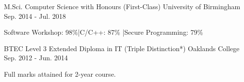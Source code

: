 

\begin{cventries}

  \cventry
  {M.Sci. Computer Science with Honours (First-Class)} %
    {University of Birmingham} %
    {} %
    {Sep. 2014 - Jul. 2018} %
    {
      \begin{cvitems}
      \item {Software Workshop: 98\%\hspace*{3mm}|\hspace*{3mm}C/C++: 87\%
        \hspace*{3mm}|\hspace*{3mm}Secure Programming: 79\%}
      \end{cvitems}
    }

  \cventry
  {BTEC Level 3 Extended Diploma in IT (Triple Distinction*)} %
    {Oaklands College} %
    {} %
    {Sep. 2012 - Jun. 2014} %
    {
      \begin{cvitems} %
        \item {Full marks attained for 2-year course.}
      \end{cvitems}
    }

\end{cventries}
